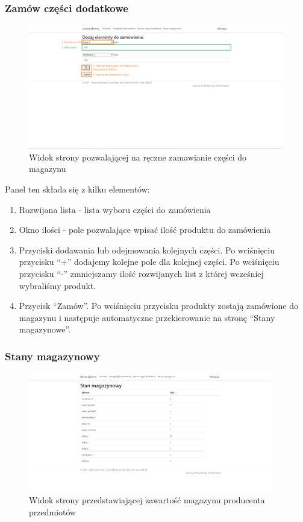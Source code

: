 \documentclass{article}
\begin{document}
\subsubsection{Zamów części dodatkowe}
\begin{figure}[H]
   \centering
   \includegraphics[width=0.99\textwidth,frame]{Wyglad/czesci_dodatkowe_admin.png}
   \caption{Widok strony pozwalającej na ręczne zamawianie części do magazynu}
\end{figure}
Panel ten składa się z kilku elementów:
\begin{enumerate}
   \item Rozwijana lista - lista wyboru części do zamówienia
   \item Okno ilości - pole pozwalające wpisać ilość produktu do zamówienia
   \item Przyciski dodawania lub odejmowania kolejnych części. Po wciśnięciu przycisku ``+''
         dodajemy kolejne pole dla kolejnej części. Po wciśnięciu przycisku ``-'' zmniejszamy ilość
         rozwijanych list z której wcześniej wybraliśmy produkt.
   \item Przycisk ``Zamów''. Po wciśnięciu przycisku produkty zostają zamówione do magazynu i
         następuje automatyczne przekierowanie na stronę ``Stany magazynowe''.
\end{enumerate}

\subsubsection{Stany magazynowy}
\begin{figure}[H]
   \centering
   \includegraphics[width=0.95\textwidth,frame]{Wyglad/magazyn_admin.png}
   \caption{Widok strony przedstawiającej zawartość magazynu producenta przedmiotów}
\end{figure}
\end{document}
